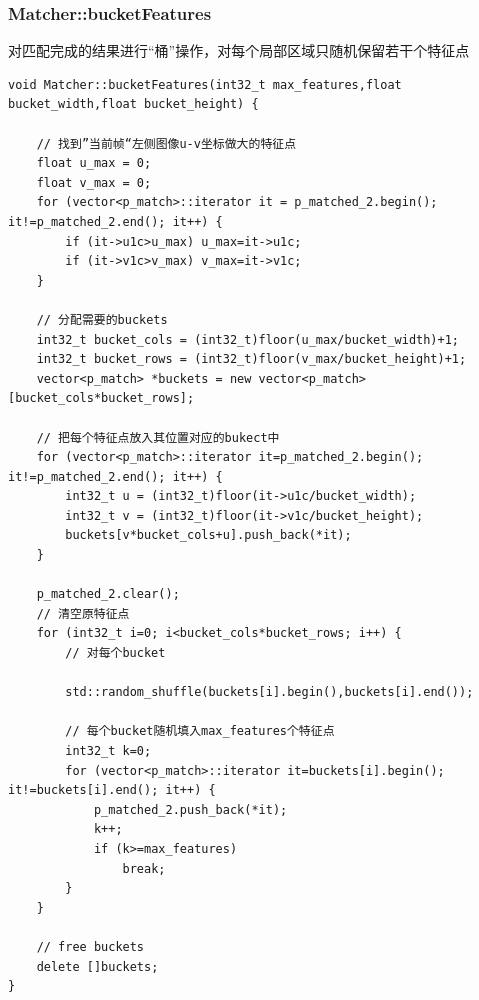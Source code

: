 \documentclass[UTF8]{ctexart}
\begin{document}
    \subsubsection{Matcher::bucketFeatures}
    对匹配完成的结果进行“桶”操作，对每个局部区域只随机保留若干个特征点
    \begin{verbatim}
void Matcher::bucketFeatures(int32_t max_features,float bucket_width,float bucket_height) {

    // 找到”当前帧“左侧图像u-v坐标做大的特征点
    float u_max = 0;
    float v_max = 0;
    for (vector<p_match>::iterator it = p_matched_2.begin(); it!=p_matched_2.end(); it++) {
        if (it->u1c>u_max) u_max=it->u1c;
        if (it->v1c>v_max) v_max=it->v1c;
    }

    // 分配需要的buckets
    int32_t bucket_cols = (int32_t)floor(u_max/bucket_width)+1;
    int32_t bucket_rows = (int32_t)floor(v_max/bucket_height)+1;
    vector<p_match> *buckets = new vector<p_match>[bucket_cols*bucket_rows];

    // 把每个特征点放入其位置对应的bukect中
    for (vector<p_match>::iterator it=p_matched_2.begin(); it!=p_matched_2.end(); it++) {
        int32_t u = (int32_t)floor(it->u1c/bucket_width);
        int32_t v = (int32_t)floor(it->v1c/bucket_height);
        buckets[v*bucket_cols+u].push_back(*it);
    }
    
    p_matched_2.clear();
    // 清空原特征点
    for (int32_t i=0; i<bucket_cols*bucket_rows; i++) {
        // 对每个bucket
        
        std::random_shuffle(buckets[i].begin(),buckets[i].end());
        
        // 每个bucket随机填入max_features个特征点
        int32_t k=0;
        for (vector<p_match>::iterator it=buckets[i].begin(); it!=buckets[i].end(); it++) {
            p_matched_2.push_back(*it);
            k++;
            if (k>=max_features)
                break;
        }
    }

    // free buckets
    delete []buckets;
}        
    \end{verbatim}
\end{document}
